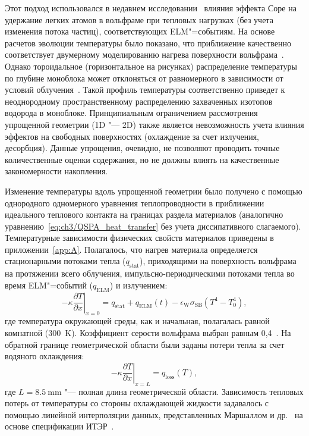 Этот подход использовался в недавнем исследовании~\cite{Dasgupta2023} влияния эффекта Соре на удержание легких атомов в вольфраме при тепловых нагрузках (без учета изменения потока частиц), соответствующих ELM"=событиям. На основе расчетов эволюции температуры было показано, что приближение качественно соответствует двумерному моделированию нагрева поверхности вольфрама~\cite{VandenKerkhof2021}. Однако тороидальное (горизонтальное на рисунках) распределение температуры по глубине моноблока может отклоняться от равномерного в зависимости от условий облучения~\cite{Delaporte-Mathurin2020, Delaporte-Mathurin2023}. Такой профиль температуры соответственно приведет к неоднородному пространственному распределению захваченных изотопов водорода в моноблоке. Принципиальным ограничением рассмотрения упрощенной геометрии (1D "--- 2D) также является невозможность учета влияния эффектов на свободных поверхностях (охлаждение за счет излучения, десорбция). Данные упрощения, очевидно, не позволяют проводить точные количественные оценки содержания, но не должны влиять на качественные закономерности накопления.

Изменение температуры вдоль упрощенной геометрии было получено с помощью однородного одномерного уравнения теплопроводности в приближении идеального теплового контакта на границах раздела материалов (аналогично уравнению~\cref{eq:ch3/QSPA_heat_transfer} без учета диссипативного слагаемого). Температурные зависимости физических свойств материалов приведены в приложении~\cref{app:A}. Полагалось, что нагрев материала определяется стационарными потоками тепла (\( q_\mathrm{stat} \)), приходящими на поверхность вольфрама на протяжении всего облучения, импульсно-периодическими потоками тепла во время ELM"=событий (\( q_\mathrm{ELM} \)) и излучением:
\begin{equation}
	\label{eq:ch3/left_BC_ITER}
	\left.-\kappa\frac{\partial T}{\partial x}\right\vert_{x=0}=q_{\mathrm{stat}}+q_{\mathrm{ELM}}(t)-\epsilon_{\mathrm{W}}\sigma_\mathrm{SB}(T^4-T_0^4),
\end{equation}
где температура окружающей среды, как и начальная, полагалась равной комнатной (\SI{300}{\kelvin}). Коэффициент серости вольфрама выбран равным 0,4~\cite{weast1975crc}. На обратной границе геометрической области были заданы потери тепла за счет водяного охлаждения:
\begin{equation}
	\label{eq:ch3/right_BC_ITER}
	\left.-\kappa\frac{\partial T}{\partial x}\right\vert_{x=L}=q_{\mathrm{loss}}(T),
\end{equation}
где \( L=\SI{8.5}{\milli\meter} \) "--- полная длина геометрической области. Зависимость тепловых потерь от температуры со стороны охлаждающей жидкости задавалось с помощью линейной интерполяции данных, представленных Маршаллом и др.~\cite{Marshall2001} на основе спецификации ИТЭР~\cite{komarov2013thermal}.

